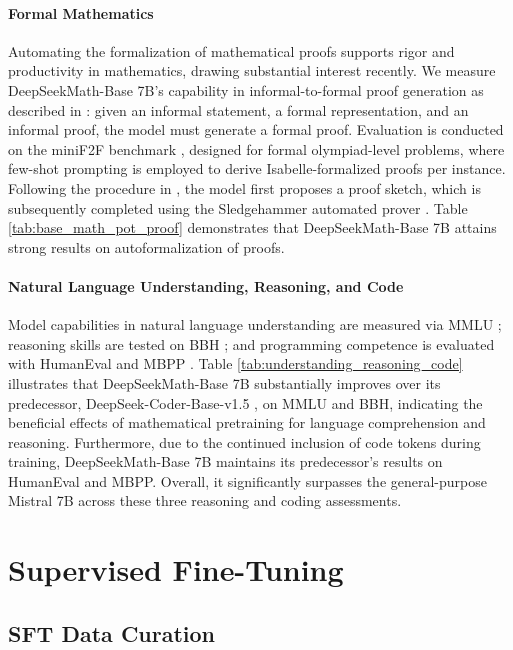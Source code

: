 \paragraph{Formal Mathematics}

Automating the formalization of mathematical proofs supports rigor and productivity in mathematics, drawing substantial interest recently. We measure DeepSeekMath-Base 7B’s capability in informal-to-formal proof generation as described in \citep{dsp_proof}: given an informal statement, a formal representation, and an informal proof, the model must generate a formal proof. Evaluation is conducted on the miniF2F benchmark \citep{minif2f}, designed for formal olympiad-level problems, where few-shot prompting is employed to derive Isabelle-formalized proofs per instance. Following the procedure in \cite{dsp_proof}, the model first proposes a proof sketch, which is subsequently completed using the Sledgehammer automated prover \citep{sledgehammer}. Table \ref{tab:base_math_pot_proof} demonstrates that DeepSeekMath-Base 7B attains strong results on autoformalization of proofs.

\paragraph{Natural Language Understanding, Reasoning, and Code}

Model capabilities in natural language understanding are measured via MMLU \citep{mmlu}; reasoning skills are tested on BBH \citep{bbh}; and programming competence is evaluated with HumanEval \citep{codex} and MBPP \citep{mbpp}. Table \ref{tab:understanding_reasoning_code} illustrates that DeepSeekMath-Base 7B substantially improves over its predecessor, DeepSeek-Coder-Base-v1.5 \citep{deepseek-coder}, on MMLU and BBH, indicating the beneficial effects of mathematical pretraining for language comprehension and reasoning. Furthermore, due to the continued inclusion of code tokens during training, DeepSeekMath-Base 7B maintains its predecessor’s results on HumanEval and MBPP. Overall, it significantly surpasses the general-purpose Mistral 7B \citep{mistral} across these three reasoning and coding assessments.

\section{Supervised Fine-Tuning}

\subsection{SFT Data Curation}

